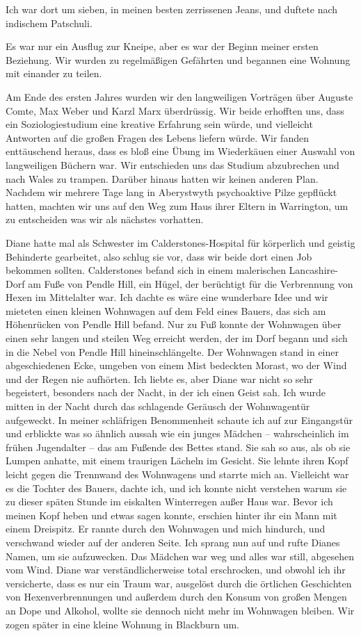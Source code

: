 \documentclass[12pt]{memoir}
\begin{document}
Ich war dort um sieben, in meinen besten zerrissenen Jeans,
und duftete nach indischem Patschuli.

Es war nur ein Ausflug zur Kneipe,
aber es war der Beginn meiner ersten Beziehung.
Wir wurden zu regelmäßigen Gefährten
und begannen eine Wohnung mit einander zu teilen.

Am Ende des ersten Jahres wurden wir den langweiligen Vorträgen über
Auguste Comte, Max Weber und Karzl Marx überdrüssig.
Wir beide erhofften uns, dass ein Soziologiestudium
eine kreative Erfahrung sein würde,
und vielleicht Antworten auf die großen Fragen des Lebens liefern würde.
Wir fanden enttäuschend heraus, dass es bloß eine Übung im Wiederkäuen
einer Auswahl von langweiligen Büchern war.
Wir entschieden uns das Studium abzubrechen und nach Wales zu trampen.
Darüber hinaus hatten wir keinen anderen Plan.
Nachdem wir mehrere Tage lang in Aberystwyth
psychoaktive Pilze gepflückt hatten,
machten wir uns auf den Weg zum Haus ihrer Eltern in Warrington,
um zu entscheiden was wir als nächstes vorhatten.

Diane hatte mal als Schwester im Calderstones-Hospital für körperlich
und geistig Behinderte gearbeitet, also schlug sie vor,
dass wir beide dort einen Job bekommen sollten.
Calderstones befand sich in einem malerischen Lancashire-Dorf
am Fuße von Pendle Hill, ein Hügel,
der berüchtigt für die Verbrennung von Hexen im Mittelalter war.
Ich dachte es wäre eine wunderbare Idee
und wir mieteten einen kleinen Wohnwagen auf dem Feld eines Bauers,
das sich am Höhenrücken von Pendle Hill befand.
Nur zu Fuß konnte der Wohnwagen über einen sehr langen
und steilen Weg erreicht werden,
der im Dorf begann und sich in die Nebel von Pendle Hill hineinschlängelte.
Der Wohnwagen stand in einer abgeschiedenen Ecke,
umgeben von einem Mist bedeckten Morast,
wo der Wind und der Regen nie aufhörten.
Ich liebte es, aber Diane war nicht so sehr begeistert,
besonders nach der Nacht, in der ich einen Geist sah.
Ich wurde mitten in der Nacht durch das schlagende Geräusch
der Wohnwagentür aufgeweckt.
In meiner schläfrigen Benommenheit schaute ich auf zur Eingangstür
und erblickte was so ähnlich aussah wie ein junges Mädchen –
wahrscheinlich im frühen Jugendalter –
das am Fußende des Bettes stand.
Sie sah so aus, als ob sie Lumpen anhatte,
mit einem traurigen Lächeln im Gesicht.
Sie lehnte ihren Kopf leicht gegen die Trennwand des Wohnwagens
und starrte mich an.
Vielleicht war es die Tochter des Bauers, dachte ich,
und ich konnte nicht verstehen warum sie zu dieser späten Stunde
im eiskalten Winterregen außer Haus war.
Bevor ich meinen Kopf heben und etwas sagen konnte,
erschien hinter ihr ein Mann mit einem Dreispitz.
Er rannte durch den Wohnwagen und mich hindurch,
und verschwand wieder auf der anderen Seite.
Ich sprang nun auf und rufte Dianes Namen, um sie aufzuwecken.
Das Mädchen war weg und alles war still, abgesehen vom Wind.
Diane war verständlicherweise total erschrocken,
und obwohl ich ihr versicherte, dass es nur ein Traum war,
ausgelöst durch die örtlichen Geschichten von Hexenverbrennungen
und außerdem durch den Konsum von großen Mengen an Dope und Alkohol,
wollte sie dennoch nicht mehr im Wohnwagen bleiben.
Wir zogen später in eine kleine Wohnung in Blackburn um.
\end{document}
